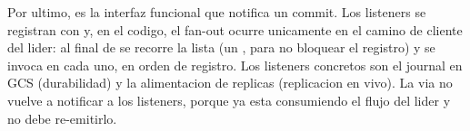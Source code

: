 Por ultimo,  es la interfaz funcional que
notifica un commit. Los listeners se registran con 
y, en el codigo, el fan-out ocurre unicamente en el camino de cliente del lider:
al final de  se recorre la lista (un
, para no bloquear el registro) y se invoca
 en cada uno, en orden de registro. Los listeners
concretos son el journal en GCS (durabilidad) y la alimentacion de replicas
(replicacion en vivo). La via  no vuelve a notificar a
los listeners, porque ya esta consumiendo el flujo del lider y no debe
re-emitirlo.
